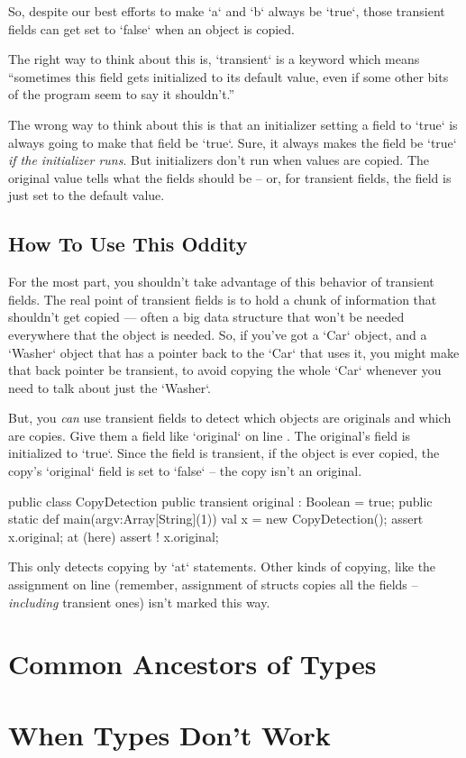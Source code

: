 So, despite our best efforts to make \xcd`a` and \xcd`b` always be \xcd`true`,
those transient fields can get set to \xcd`false` when an object is copied.  

The right way to think about this is, \xcd`transient` is a keyword which means
``sometimes this field gets initialized to its default value, even if some
other bits of the program seem to say it shouldn't.''

The wrong way to think about this is that an initializer setting a field to
\xcd`true` is always going to make that field be \xcd`true`.  Sure, it always
makes the field be \xcd`true` {\em if the initializer runs}.  But initializers
don't run when values are copied.  The original value tells what the fields
should be -- or, for transient fields, the field is just set to the default
value.

\subsection{How To Use This Oddity}

For the most part, you shouldn't take advantage of this behavior of transient
fields.  The real point of transient fields is to hold a chunk of information
that shouldn't get copied --- often a big data structure that won't be needed
everywhere that the object is needed. So, if you've got a \xcd`Car` object,
and a \xcd`Washer` object that has a pointer back to the \xcd`Car` that uses
it,  you might make that back pointer be transient, to avoid copying the whole
\xcd`Car` whenever you need to talk about just the \xcd`Washer`. 

But, you {\em can} use transient fields to detect which objects are originals
and which are copies. 
Give them a field like \xcd`original` on line .  
The original's field is initialized to \xcd`true`.    Since the field is
transient, if the object is ever copied, the copy's \xcd`original` field is
set to \xcd`false` -- the copy isn't an original.
\begin{xtennum}[]
public class CopyDetection {
  public transient original : Boolean = true; 
  public static def main(argv:Array[String](1)) {
     val x = new CopyDetection();
     assert x.original;  
     at (here) {
       assert ! x.original; 
     }
  }
}
\end{xtennum}

This only detects copying by \xcd`at` statements.  Other kinds of copying,
like the assignment on line  (remember, assignment of
structs copies all the fields -- {\em including} transient ones) isn't marked
this way.  







\section{Common Ancestors of Types}
\section{When Types Don't Work}


